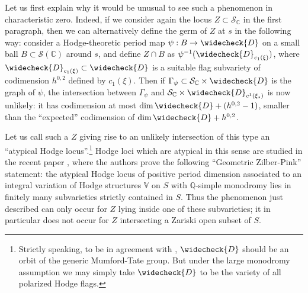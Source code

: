 \documentclass[letter, 11pt]{article}
\theoremstyle{plain}
\theoremstyle{definition}
\newcommand{\IC}{\mathbb{C}}
\newcommand{\IQ}{\mathbb{Q}}
\newcommand{\IV}{\mathbb{V}}
\newcommand{\che}[1]{\widecheck{#1}}
\newcommand{\<}{\langle}
\renewcommand{\>}{\rangle}
\newcommand{\sS}{\mathcal{S}}
\begin{document}
Let us first explain why it would be unusual to see such a phenomenon in characteristic zero. Indeed, if we consider again the locus $Z \subset \sS_{\IC}$ in the first paragraph, then we can alternatively define the germ of $Z$ at $s$ in the following way: consider a Hodge-theoretic period map $\psi : B \to \che{D}$ on a small ball $B \subset \sS(\IC)$ around $s$, and define $Z \cap B$ as $\psi^{-1}(\che{D}_{c_1(\xi)})$, where $\che{D}_{c_1(\xi)} \subset \che{D}$ is a suitable flag subvariety of codimension $h^{0, 2}$ defined by $c_1(\xi)$. Then if $\Gamma_{\psi} \subset \sS_{\IC} \times \che{D}$ is the graph of $\psi$, the intersection between $\Gamma_{\psi}$ and $\sS_{\IC} \times \che{D}_{c^{1}(\xi_{s})}$ is now unlikely: it has codimension at most $\dim \che{D} + (h^{0,2} - 1)$, smaller than the ``expected'' codimension of $\dim \che{D} + h^{0,2}$. 

Let us call such a $Z$ giving rise to an unlikely intersection of this type an ``atypical Hodge locus''.\footnote{Strictly speaking, to be in agreement with \cite{BKU}, $\che{D}$ should be an orbit of the generic Mumford-Tate group. But under the large monodromy assumption we may simply take $\che{D}$ to be the variety of all polarized Hodge flags. } Hodge loci which are atypical in this sense are studied in the recent paper \cite{BKU}, where the authors prove the following ``Geometric Zilber-Pink'' statement: the atypical Hodge locus of positive period dimension associated to an integral variation of Hodge structures $\IV$ on $S$ with $\IQ$-simple monodromy lies in finitely many subvarieties strictly contained in $S$. Thus the phenomenon just described can only occur for $Z$ lying inside one of these subvarieties; it in particular does not occur for $Z$ intersecting a Zariski open subset of $S$.

\vspace{0.5em}
\end{document}
